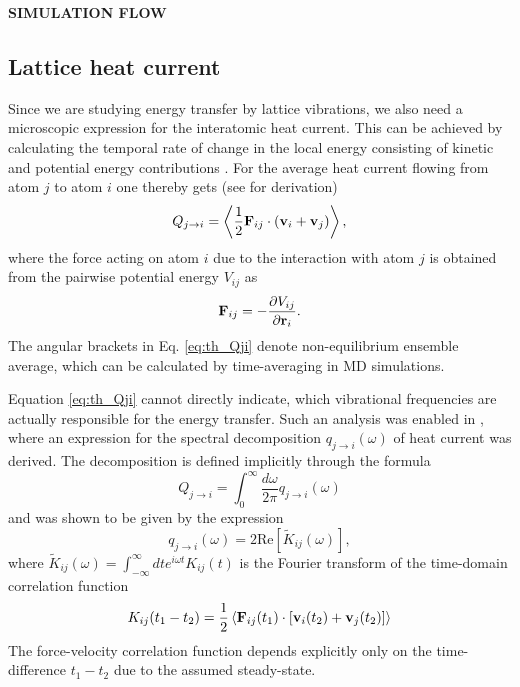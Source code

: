 \textbf{SIMULATION FLOW}

\subsection{Lattice heat current}

Since we are studying energy transfer by lattice vibrations, we also need a microscopic expression for the interatomic heat current. This can be achieved by calculating the temporal rate of change in the local energy consisting of kinetic and potential energy contributions \cite{hardy63,lepri03}. For the average heat current flowing from atom $j$ to atom $i$ one thereby gets (see  for derivation) 
\begin{equation}
 Q_{j\to i} = \left\langle \frac{1}{2} \mathbf{F}_{ij} \cdot \left( \mathbf{v}_i+\mathbf{v}_j \right) \right\rangle, \label{eq:th_Qji}
\end{equation}
where the force acting on atom $i$ due to the interaction with atom $j$ is obtained from the pairwise potential energy $V_{ij}$ as
\begin{equation}
 \mathbf{F}_{ij} = - \frac{\partial V_{ij}}{\partial \mathbf{r}_i}.
\end{equation}
The angular brackets in Eq. \eqref{eq:th_Qji} denote non-equilibrium ensemble average, which can be calculated by time-averaging in MD simulations. 

Equation \eqref{eq:th_Qji} cannot directly indicate, which vibrational frequencies are actually responsible for the energy transfer. Such an analysis was enabled in , where an expression for the spectral decomposition $q_{j\to i}(\omega)$ of heat current was derived. The decomposition is defined implicitly through the formula
\begin{equation}
 Q_{j\to i} = \int_0^{\infty} \frac{d\omega}{2\pi} q_{j\to i}(\omega)
\end{equation}
and was shown to be given by the expression
\begin{equation}
 q_{j \to i}(\omega) = 2\textrm{Re} [\tilde K_{ij}(\omega)],
\end{equation}
where $\tilde K_{ij}(\omega)=\int_{-\infty}^{\infty} dt e^{i\omega t}K_{ij}(t)$ is the Fourier transform of the time-domain correlation function
\begin{equation}
 K_{ij}(t_1-t_2) = \frac{1}{2} \left\langle \mathbf{F}_{ij}(t_1) \cdot \left[ \mathbf{v}_i(t_2)+\mathbf{v}_j(t_2)\right] \right\rangle \label{eq:th_Kijt1t2}
\end{equation}
The force-velocity correlation function depends explicitly only on the time-difference $t_1-t_2$ due to the assumed steady-state. 

